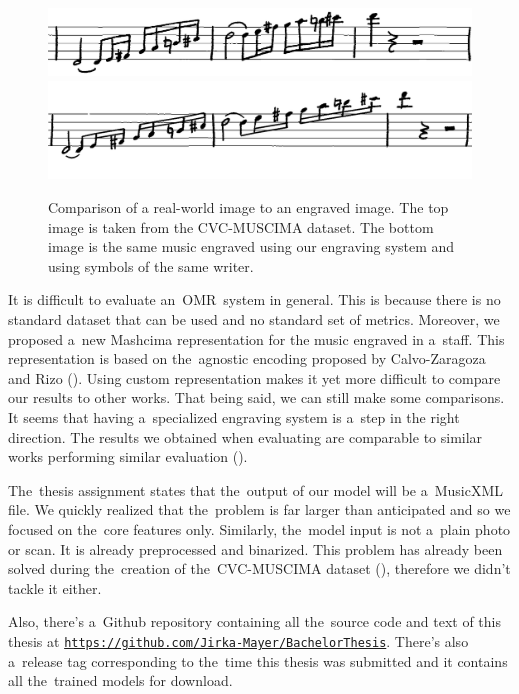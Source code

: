 \begin{figure}[h]
    \centering
    \includegraphics[width=130mm]{../img/comparison-real}
    \includegraphics[width=140mm]{../img/comparison-engraved}
    \caption{
    Comparison of a real-world image to an engraved image. The top image is taken from the CVC-MUSCIMA dataset. The bottom image is the same music engraved using our engraving system and using symbols of the same writer.
    }
    \label{fig1:Comparison}
\end{figure}

It is difficult to evaluate an~OMR~system in general. This is because there is no standard dataset that can be used and no standard set of metrics. Moreover, we proposed a~new Mashcima representation for the music engraved in a~staff. This representation is based on the~agnostic encoding proposed by Calvo-Zaragoza and Rizo (\cite{Primus}). Using custom representation makes it yet more difficult to compare our results to other works. That being said, we can still make some comparisons. It seems that having a~specialized engraving system is a~step in the right direction. The results we obtained when evaluating are comparable to similar works performing similar evaluation (\cite{HmrBaseline}).

The~thesis assignment states that the~output of our model will be a~MusicXML file. We quickly realized that the~problem is far larger than anticipated and so we focused on the~core features only. Similarly, the~model input is not a~plain photo or scan. It is already preprocessed and binarized. This problem has already been solved during the~creation of the~CVC-MUSCIMA dataset (\cite{CvcMuscima}), therefore we didn't tackle it either.

Also, there's a~Github repository containing all the~source code and text of this thesis at \href{https://github.com/Jirka-Mayer/BachelorThesis}{\texttt{https://github.com/Jirka-Mayer/BachelorThesis}}. There's also a~release tag corresponding to the~time this thesis was submitted and it contains all the~trained models for download.

